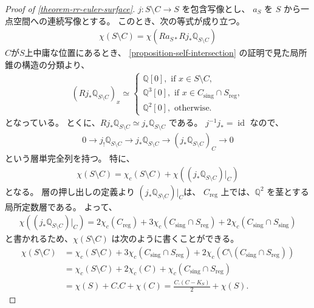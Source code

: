 \documentclass[a4paper,dvipdfmx,reqno,12pt]{amsart}
\theoremstyle{definition}
\newcommand{\opn}[1]{\operatorname{#1}}
\numberwithin{equation}{section}
\begin{document}
\begin{proof}[{Proof of \cref{theorem-rr-euler-surface}}]

$j\colon S\setminus C\to S$ を包含写像とし、
$a_S$ を $S$ から一点空間への連続写像とする。
このとき、次の等式が成り立つ。
\begin{align}
\chi(S\setminus C)=\chi(Ra_{S*}Rj_*\mathbb{Q}_{S\setminus C}) 
\end{align}
$C$が$S$上中庸な位置にあるとき、
\cref{proposition-self-intersection}
の証明で見た局所錐の構造の分類より、
\begin{align}
(Rj_*\mathbb{Q}_{S\setminus C})_x
\simeq
\begin{cases}
\mathbb{Q}[0], \text{ if } x\in S\setminus C, \\
\mathbb{Q}^3[0], \text{ if } x\in C_{\mathrm{sing}}
\cap S_{\mathrm{reg}}, \\
\mathbb{Q}^2[0], \text{ otherwise.}  
\end{cases}  
\end{align}
となっている。
とくに、$Rj_*\mathbb{Q}_{S\setminus C}\simeq
j_*\mathbb{Q}_{S\setminus C}$ である。
$j^{-1}j_*=\opn{id}$ なので、
\begin{align}
0\to j_!\mathbb{Q}_{S\setminus C} 
\to j_* \mathbb{Q}_{S\setminus C}
\to (j_*\mathbb{Q}_{S\setminus C})_{C} \to 0
\end{align}
という層単完全列を持つ。
特に、
\begin{align}
\chi(S\setminus C)=
\chi_c(S\setminus C)+\chi((j_*\mathbb{Q}_{S\setminus C})|_C)
\end{align}
となる。
層の押し出しの定義より
$(j_*\mathbb{Q}_{S\setminus C})|_C$は、
$C_{\opn{reg}}$ 上では、$\mathbb{Q}^2$
を茎とする局所定数層である。
よって、
\begin{align}
\chi((j_*\mathbb{Q}_{S\setminus C})|_C)=
2\chi_c(C_{\mathrm{reg}})+
3\chi_c(C_{\mathrm{sing}}\cap S_{\mathrm{reg}})+
2\chi_c(C_{\mathrm{sing}}\cap S_{\mathrm{sing}})
\end{align}
と書かれるため、$\chi(S\setminus C)$
は次のように書くことができる。
\begin{align}
\label{equation-euler-calculus}
\chi(S\setminus C)&=
\chi_c(S\setminus C)+
3\chi_c(C_{\mathrm{sing}}
\cap S_{\mathrm{reg}})+
2\chi_c(C\setminus (C_{\mathrm{sing}}
\cap S_{\mathrm{reg}}))\\
&=\chi_c(S\setminus C)+2\chi_c(C)+
\chi_c(C_{\mathrm{sing}}
\cap S_{\mathrm{reg}}) \\
&=\chi(S)+C.C+\chi(C)
=\frac{C.(C-K_S)}{2}+\chi(S).
\end{align}
\end{proof}
\end{document}
